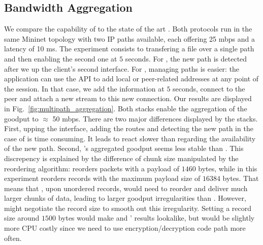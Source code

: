 

\subsection{Bandwidth Aggregation}

We compare the capability of \tcpls to the state of the art \mptcp. Both
protocols run in the same Mininet topology with two IP paths available, 
each 
offering 25 mbps and a latency of 10 ms. The experiment consists to transfering
a file over a single path and then enabling the second one at $5$ seconds. For
\mptcp, the new path is detected after we up the client's second interface. For
\tcpls, managing paths is easier: the application can use the API to add local
or peer-related addresses at any point of the session. In that case, we add
the information at $5$ seconds, connect to the peer and attach a new stream to
this new connection. Our results are displayed in
Fig.~\ref{fig:multipath_aggregation}. Both stacks enable the aggregation of the
goodput to  $\approx$ 50 mbps. There are two major differences displayed by the stacks.
First, upping the interface, adding the routes and detecting the new path in
the case of \mptcp is time consuming. It leads \mptcp to react slower than
\tcpls regarding the availability of the new path. Second, \tcpls's aggregated
goodput seems less stable than \mptcp. This discrepency is explained by the
difference of chunk size manipulated by the reordering algorithm: \mptcp
reorders packets with a payload of $1460$ bytes, while \tcpls in this experiment
reorders records with the maximum payload size of $16384$ bytes. That means
that \tcpls, upon unordered records, would need to reorder and deliver much
larger chunks of data, leading to larger goodput irregularities than \mptcp.
However, \tcpls might  negotiate the record size to smooth out this
irregularity. Setting a record size around $1500$ bytes would make \mptcp and
\tcpls' results lookalike, but would be slightly more CPU costly since we need
to use encryption/decryption code path more often.

